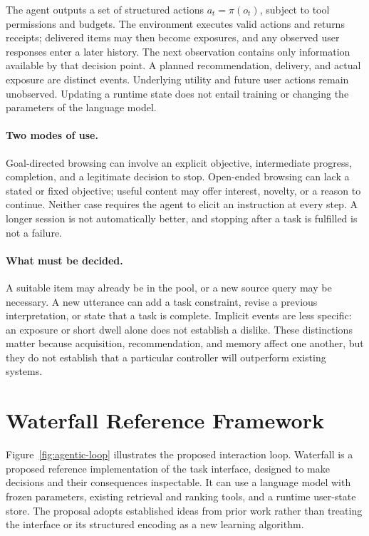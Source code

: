 \documentclass[11pt]{article}
\begin{document}
The agent outputs a set of structured actions $a_t = \pi(o_t)$, subject to tool permissions and budgets. The environment executes valid actions and returns receipts; delivered items may then become exposures, and any observed user responses enter a later history. The next observation contains only information available by that decision point. A planned recommendation, delivery, and actual exposure are distinct events. Underlying utility and future user actions remain unobserved. Updating a runtime state does not entail training or changing the parameters of the language model.

\paragraph{Two modes of use.} Goal-directed browsing can involve an explicit objective, intermediate progress, completion, and a legitimate decision to stop. Open-ended browsing can lack a stated or fixed objective; useful content may offer interest, novelty, or a reason to continue. Neither case requires the agent to elicit an instruction at every step. A longer session is not automatically better, and stopping after a task is fulfilled is not a failure.

\paragraph{What must be decided.} A suitable item may already be in the pool, or a new source query may be necessary. A new utterance can add a task constraint, revise a previous interpretation, or state that a task is complete. Implicit events are less specific: an exposure or short dwell alone does not establish a dislike. These distinctions matter because acquisition, recommendation, and memory affect one another, but they do not establish that a particular controller will outperform existing systems.

\section{Waterfall Reference Framework}
\label{sec:method}
Figure~\ref{fig:agentic-loop} illustrates the proposed interaction loop. Waterfall is a proposed reference implementation of the task interface, designed to make decisions and their consequences inspectable. It can use a language model with frozen parameters, existing retrieval and ranking tools, and a runtime user-state store. The proposal adopts established ideas from prior work rather than treating the interface or its structured encoding as a new learning algorithm.
\end{document}
